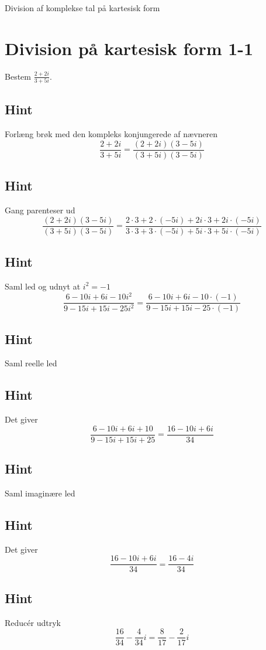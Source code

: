 \documentclass{article}
\newenvironment{exercise}[1]{\newpage\section{#1}}{}
\newcommand{\answerbox}[1]{\fbox{$#1$}}
\newcommand{\hint}{\subsection*{Hint}}
\begin{document}
Division af komplekse tal på kartesisk form
\tableofcontents
\newpage

\begin{exercise}{Division på kartesisk form 1-1}

Bestem $\frac{2+2i}{3+5i}$.

\answerbox{\frac{8}{17} - \frac{2}{17}i}


\hint 

Forlæng brøk med den kompleks konjungerede af nævneren
\[
\frac{2+2i}{3+5i} = \frac{(2+2i)(3-5i)}{(3+5i)(3-5i)}
\]

\hint

Gang parenteser ud
\[
\frac{(2+2i)(3-5i)}{(3+5i)(3-5i)} = \frac{2 \cdot 3 + 2\cdot (-5i) + 2i \cdot 3 + 2i \cdot (-5i)}{3 \cdot 3 + 3\cdot (-5i)+5i \cdot 3 + 5i \cdot (-5i)}
\]

\hint 

Saml led og udnyt at $i^2 = -1$
\[
\frac{6-10i+6i-10i^2}{9-15i+15i-25i^2} = \frac{6-10i+6i-10 \cdot (-1)}{9-15i+15i-25 \cdot (-1)} 
\]

\hint

Saml reelle led

\hint

Det giver
\[
\frac{6-10i+6i+10}{9-15i+15i+ 25} = \frac{16 -10i + 6i}{34}
\]

\hint

Saml imaginære led


\hint

Det giver 
\[
\frac{16 -10i + 6i}{34} = \frac{16-4i}{34}
\]

\hint

Reducér udtryk
\[
\frac{16}{34} - \frac{4}{34}i  =\frac{8}{17} - \frac{2}{17}i
\]

\end{exercise}

\newpage
\end{document}
